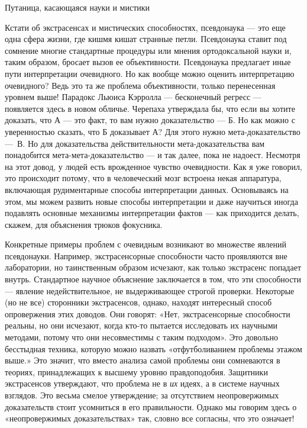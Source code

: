 \documentclass[../main.tex]{subfiles}
\begin{document}
Путаница, касающаяся науки и мистики

Кстати об экстрасенсах и мистических способностях, псевдонаука --- это еще одна сфера жизни, где кишмя кишат странные петли. Псевдонаука ставит под сомнение многие стандартные процедуры или мнения ортодоксальной науки и, таким образом, бросает вызов ее объективности. Псевдонаука предлагает иные пути интерпретации очевидного. Но как вообще можно оценить интерпретацию очевидного? Ведь это та же проблема объективности, только перенесенная уровнем выше! Парадокс Льюиса Кэрролла --- бесконечный регресс --- появляется здесь в новом обличье. Черепаха утверждала бы, что если вы хотите доказать, что А --- это факт, то вам нужно доказательство --- Б. Но как можно с уверенностью сказать, что Б доказывает А? Для этого нужно мета-доказательство ---~В. Но для доказательства действительности мета-доказательства вам понадобится мета-мета-доказательство --- и так далее, пока не надоест. Несмотря на этот довод, у людей есть врожденное чувство очевидности. Как я уже говорил, это происходит потому, что в человеческий мозг встроена некая аппаратура, включающая рудиментарные способы интерпретации данных. Основываясь на этом, мы можем развить новые способы интерпретации и даже научиться иногда подавлять основные механизмы интерпретации фактов --- как приходится делать, скажем, для объяснения трюков фокусника.

Конкретные примеры проблем с очевидным возникают во множестве явлений псевдонауки. Например, экстрасенсорные способности часто проявляются вне лаборатории, но таинственным образом исчезают, как только экстрасенс попадает внутрь. Стандартное научное объяснение заключается в том, что эти способности --- явление недействительное, не выдерживающее строгой проверки. Некоторые (но не все) сторонники экстрасенсов, однако, находят интересный способ опровержения этих доводов. Они говорят: «Нет, экстрасенсорные способности реальны, но они исчезают, когда кто-то пытается исследовать их научными методами, потому что они несовместимы с таким подходом». Это довольно бесстыдная техника, которую можно назвать «отфутболиванием проблемы этажом выше.» Это значит, что вместо анализа самой проблемы они сомневаются в теориях, принадлежащих к высшему уровню правдоподобия. Защитники экстрасенсов утверждают, что проблема не в \emph{их} идеях, а в системе научных взглядов. Это весьма смелое утверждение; за отсутствием неопровержимых доказательств стоит усомниться в его правильности. Однако мы говорим здесь о «неопровержимых доказательствах» так, словно все согласны, что это означает!
\end{document}
